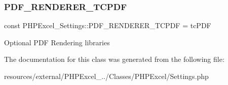 \subsubsection{\texorpdfstring{P\+D\+F\+\_\+\+R\+E\+N\+D\+E\+R\+E\+R\+\_\+\+T\+C\+P\+DF}{PDF\_RENDERER\_TCPDF}}
{\footnotesize\ttfamily const P\+H\+P\+Excel\+\_\+\+Settings\+::\+P\+D\+F\+\_\+\+R\+E\+N\+D\+E\+R\+E\+R\+\_\+\+T\+C\+P\+DF = \textquotesingle{}tc\+P\+DF\textquotesingle{}}

Optional P\+DF Rendering libraries 

The documentation for this class was generated from the following file\+:\begin{DoxyCompactItemize}
\item 
resources/external/\+P\+H\+P\+Excel\+\_../\+Classes/\+P\+H\+P\+Excel/Settings.\+php\end{DoxyCompactItemize}
